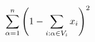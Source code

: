 \documentclass[preview]{standalone}
\begin{document}
\begin{align*}
\special{dvisvgm:raw <g id='unique000'>}\sum_{\alpha=1}^{n}\left(1-\sum_{i:\alpha \in V_i} x_i\right)^2\special{dvisvgm:raw </g>}
\end{align*}
\end{document}
